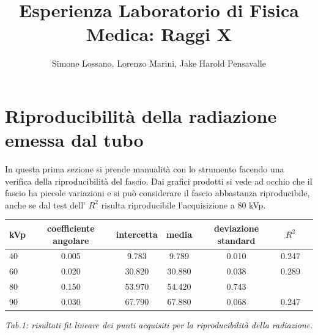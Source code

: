\documentclass[a4paper]{article}
\title{Esperienza Laboratorio di Fisica Medica: Raggi X}
\author{Simone Lossano, Lorenzo Marini, Jake Harold Pensavalle}
\begin{document}
	\maketitle
	\newpage
	\tableofcontents
	\newpage

\section{Riproducibilità della radiazione emessa dal tubo}


In questa prima sezione si prende manualità con lo strumento facendo una verifica della riproducibilità del fascio. Dai grafici prodotti si vede ad occhio che il fascio ha piccole variazioni e si può considerare il fascio abbastanza riproducibile, anche se dal test dell' $R^{2}$ risulta riproducibile l'acquisizione a 80 kVp.
\begin{center} 
		
		\begin{tabular}{lcccccc}
			\hline
			\hline
			\textbf{kVp}	& \textbf{coefficiente angolare}& \textbf{intercetta}& \textbf{media}& \textbf{deviazione standard}& \textbf{$R^{2}$} 	 \\
			\hline
			\hline
			40	&0.005&9.783&9.789&0.010&0.247 	\\
			60	&0.020&30.820&30.880&0.038&0.289\\
			80	&0.150&53.970&54.420&0.743 \\
			90	&0.030&67.790&67.880&0.068&0.247\\
			
			\hline
			\hline
		\end{tabular}
		\linebreak
		\emph{Tab.1: risultati fit lineare dei punti acquisiti per la riproducibilità della radiazione.} 
	\end{center}
\end{document}
